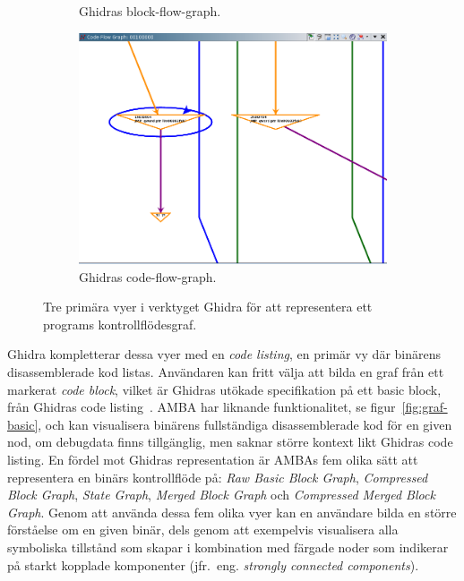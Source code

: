 \begin{figure}[H]
\begin{subfigure}{0.3\textwidth}
        \caption{Ghidras block-flow-graph.}
        \label{fig:ghidra_block_graph}
    \end{subfigure}
    \hspace*{\fill}
    \begin{subfigure}{0.3\textwidth}
        \includegraphics[width=\linewidth]{figures/ghidra_code_flow.png}
        \caption{Ghidras code-flow-graph.} \label{fig:ghidra_code_flow_graph}
    \end{subfigure}

    \caption{Tre primära vyer i verktyget Ghidra för att representera ett programs
        kontrollflödesgraf.} \label{fig:ghidra_figures}
\end{figure}

Ghidra kompletterar dessa vyer med en \textit{code listing}, en primär vy där
binärens disassemblerade kod listas. Användaren kan fritt välja att bilda en
graf från ett markerat \textit{code block}, vilket är Ghidras utökade
specifikation på ett basic block, från Ghidras code
listing~\cite{ghidra_website}. AMBA har liknande funktionalitet, se
figur~\ref{fig:graf-basic}, och kan visualisera binärens fullständiga
disassemblerade kod för en given nod, om debugdata finns tillgänglig, men saknar
större kontext likt Ghidras code listing. En fördel mot Ghidras representation
är AMBAs fem olika sätt att representera en binärs kontrollflöde på: \textit{Raw
    Basic Block Graph}, \textit{Compressed Block Graph}, \textit{State Graph},
\textit{Merged Block Graph} och \textit{Compressed Merged Block Graph}.  Genom
att använda dessa fem olika vyer kan en användare bilda en större förståelse om
en given binär, dels genom att exempelvis visualisera alla symboliska tillstånd
som \stoe{} skapar i kombination med färgade noder som indikerar på starkt
kopplade komponenter (jfr.\ eng. \emph{strongly connected components}).

